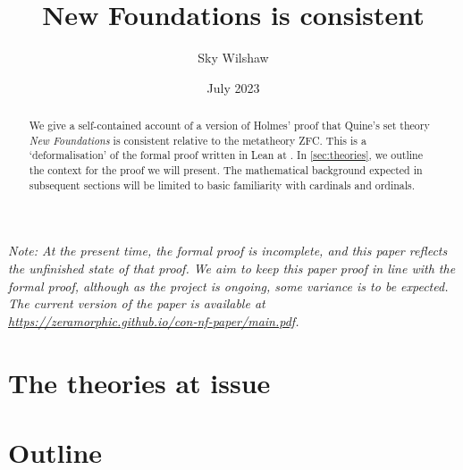 \documentclass{article}
\title{New Foundations is consistent}
\author{Sky Wilshaw}
\date{July 2023}
\theoremstyle{definition}
\theoremstyle{remark}
\begin{document}
\maketitle

\begin{abstract}
	We give a self-contained account of a version of Holmes' proof \cite{holmes2023nf} that Quine's set theory \emph{New Foundations} \cite{quine-nf} is consistent relative to the metatheory ZFC.
	This is a `deformalisation' of the formal proof written in Lean at \cite{leanprover-community-con-nf}.
	In \cref{sec:theories}, we outline the context for the proof we will present.
	The mathematical background expected in subsequent sections will be limited to basic familiarity with cardinals and ordinals.
\end{abstract}

\emph{
	Note: At the present time, the formal proof \cite{leanprover-community-con-nf} is incomplete, and this paper reflects the unfinished state of that proof.
	We aim to keep this paper proof in line with the formal proof, although as the project is ongoing, some variance is to be expected.
	The current version of the paper is available at \url{https://zeramorphic.github.io/con-nf-paper/main.pdf}.
}

\tableofcontents

\section{The theories at issue}
\label{sec:theories}


\section{Outline}


\printbibliography
\end{document}
